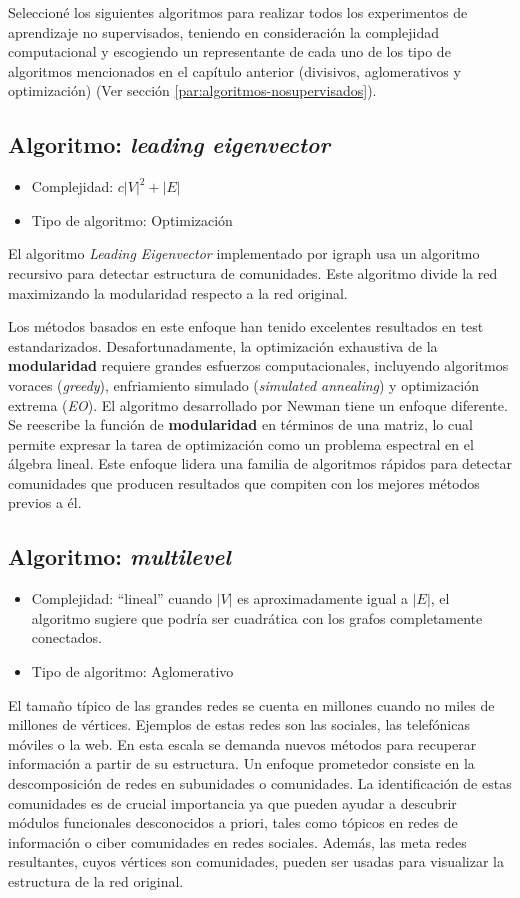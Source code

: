Seleccioné los siguientes algoritmos para realizar todos los experimentos de aprendizaje no supervisados, teniendo en consideración la complejidad computacional y escogiendo un representante de cada uno de los tipo de algoritmos mencionados en el capítulo anterior (divisivos, aglomerativos y optimización) (Ver sección \ref{par:algoritmos-nosupervisados}).

\subsection{Algoritmo: \textit{leading eigenvector}}\cite{Newman2006FindingMatrices.} 
\begin{itemize}
\item Complejidad: $c|V|^2 + |E|$
\item Tipo de algoritmo: Optimización
\end{itemize} 
El algoritmo \textit{Leading Eigenvector} implementado por igraph usa un algoritmo recursivo para detectar estructura de comunidades. Este algoritmo divide la red maximizando la modularidad respecto a la red original. 
 
Los métodos basados en este enfoque han tenido excelentes resultados en test estandarizados. Desafortunadamente, la optimización exhaustiva de la \textbf{modularidad} requiere grandes esfuerzos computacionales, incluyendo algoritmos voraces (\textit{greedy}), enfriamiento simulado (\textit{simulated annealing}) y optimización extrema (\textit{EO}). El algoritmo desarrollado por Newman tiene un enfoque diferente. Se reescribe la función de \textbf{modularidad} en términos de una matriz, lo cual permite expresar la tarea de optimización como un problema espectral en el álgebra lineal. Este enfoque lidera una familia de algoritmos rápidos para detectar comunidades que producen resultados que compiten con los mejores métodos previos a él.
 
\subsection{Algoritmo: \textit{multilevel}}\cite{Blondel2008FastNetworks} 
\begin{itemize}
\item Complejidad: ``lineal'' cuando  $|V|$ es aproximadamente igual a $|E|$, el algoritmo sugiere que podría ser cuadrática con los grafos completamente conectados.
\item Tipo de algoritmo: Aglomerativo
\end{itemize}
El tamaño típico de las grandes redes se cuenta en millones cuando no miles de millones de vértices. Ejemplos de estas redes son las sociales, las telefónicas móviles o la web. En esta escala se demanda nuevos métodos para recuperar información a partir de su estructura. Un enfoque prometedor consiste en la descomposición de redes en subunidades o comunidades. La identificación de estas comunidades es de crucial importancia ya que pueden ayudar a descubrir módulos funcionales desconocidos a priori, tales como tópicos en redes de información o ciber comunidades en redes sociales. Además, las meta redes resultantes, cuyos vértices son comunidades, pueden ser usadas para visualizar la estructura de la red original.
 
